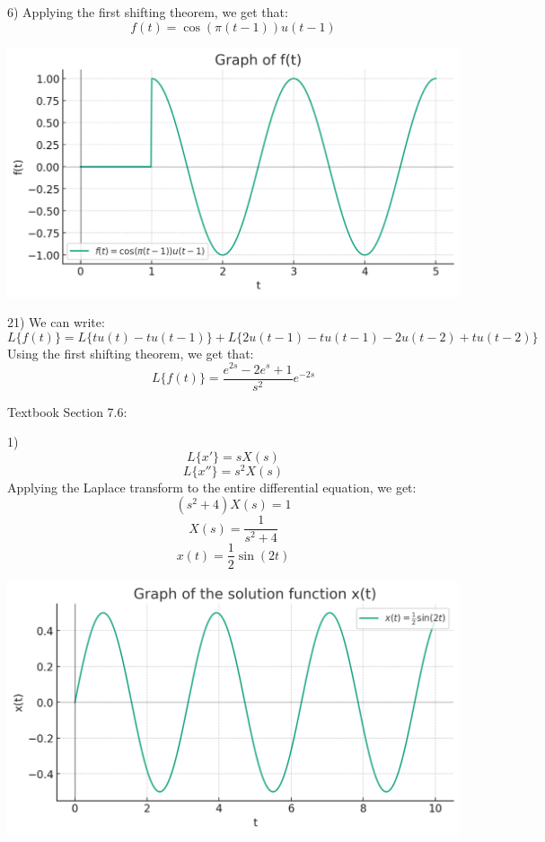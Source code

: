 \documentclass{article}
\begin{document}
6) Applying the first shifting theorem, we get that:
\[f(t) = \cos(\pi(t-1)) u(t-1)\]

\includegraphics[width=\linewidth]{7_5_6}

21) We can write:
\[L\{f(t)\} = L\{tu(t) - tu(t-1)\} + L\{2u(t-1) - tu(t-1) - 2u(t-2) + tu(t-2)\}\]
Using the first shifting theorem, we get that:
\[L\{f(t)\} = \frac{e^{2s} - 2e^s + 1}{s^2} e^{-2s}\]


Textbook Section 7.6:

1)
\[L\{x'\} = sX(s)\]
\[L\{x''\} = s^2 X(s)\]
Applying the Laplace transform to the entire differential equation, we get:
\[(s^2 + 4) X(s) = 1\]
\[X(s) = \frac{1}{s^2 + 4}\]
\[x(t) = \frac{1}{2} \sin(2t)\]

\includegraphics[width=\linewidth]{7_6_1}
\end{document}
